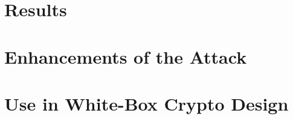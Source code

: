 
\section{Results}


\section{Enhancements of the Attack}



\section{Use in White-Box Crypto Design}



